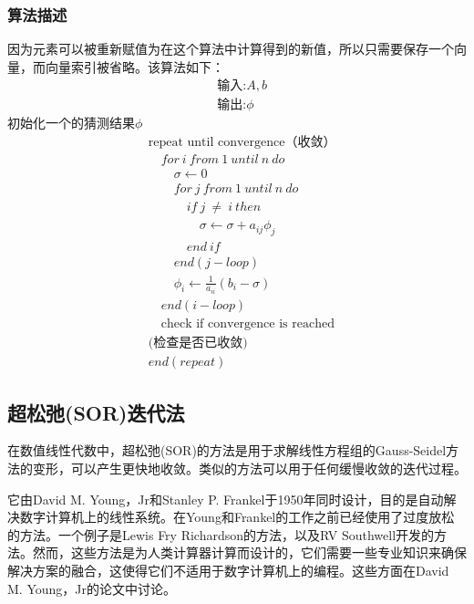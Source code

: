 \documentclass[twoside,twocolumn]{article}
\begin{document}
\begin{CJK*}{UTF8}{gkai}
	\subsubsection{算法描述}
	因为元素可以被重新赋值为在这个算法中计算得到的新值，所以只需要保存一个向量，而向量索引被省略。该算法如下：
	\begin{equation*}
	\begin{aligned}
	&\text{输入:} A, b\\
	&\text{输出:}\phi
	\end{aligned}
	\end{equation*}
	初始化一个的猜测结果$\phi$
	\begin{equation*}
	\begin{aligned}
	&\text{repeat until convergence（收敛）}\\
	&\quad for~i~from~1~until~n~do\\
	&\qquad \sigma \leftarrow 0\\
	&\qquad for~j~from~1~until~n~do\\
	&\qquad \quad if~j~\neq~i~then\\
	&\qquad \qquad \sigma \leftarrow \sigma +a_{ij}\phi _{j}\\
	&\qquad \quad end~if\\
	&\qquad end (j - loop)\\
	&\qquad \phi _{i}\leftarrow {\frac {1}{a_{ii}}}(b_{i}-\sigma )\\
	&\quad end (i-loop)\\
	&\quad \text{check if convergence is reached}\\
	&\text{(检查是否已收敛)}\\
	&end (repeat)
	\end{aligned}
	\end{equation*} 
	\subsection{超松弛(SOR)迭代法}
	在数值线性代数中，超松弛(SOR)的方法是用于求解线性方程组的Gauss-Seidel方法的变形，可以产生更快地收敛。类似的方法可以用于任何缓慢收敛的迭代过程。
	
	它由David M. Young，Jr和Stanley P. Frankel于1950年同时设计，目的是自动解决数字计算机上的线性系统。在Young和Frankel的工作之前已经使用了过度放松的方法。一个例子是Lewis Fry Richardson的方法，以及RV Southwell开发的方法。然而，这些方法是为人类计算器计算而设计的，它们需要一些专业知识来确保解决方案的融合，这使得它们不适用于数字计算机上的编程。这些方面在David M. Young，Jr的论文中讨论。

\end{CJK*}
\end{document}
